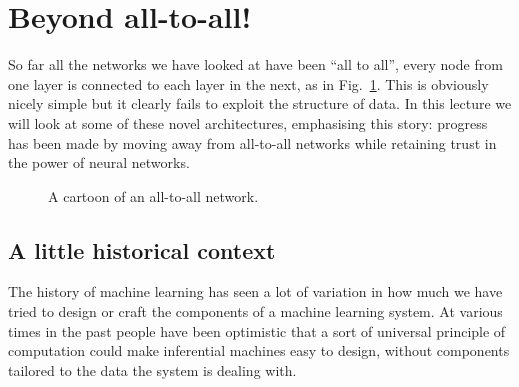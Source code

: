 \documentclass[12pt]{article}
\begin{document}
\section*{Beyond all-to-all!} 


So far all the networks we have looked at have been ``all to all'',
every node from one layer is connected to each layer in the next, as
in Fig.~\ref{fig:all-to-all}.  This is obviously nicely simple but it
clearly fails to exploit the structure of data.  In this lecture we
will look at some of these novel architectures, emphasising this
story: progress has been made by moving away from all-to-all networks
while retaining trust in the power of neural networks.


\begin{figure}[b]
\begin{center}
\end{center}
\caption{A cartoon of an all-to-all network. \label{fig:all-to-all}}
\end{figure}




\subsection*{A little historical context}

The history of machine learning has seen a lot of variation in how
much we have tried to design or craft the components of a machine
learning system. At various times in the past people have been
optimistic that a sort of universal principle of computation could
make inferential machines easy to design, without components tailored
to the data the system is dealing with.
\end{document}
